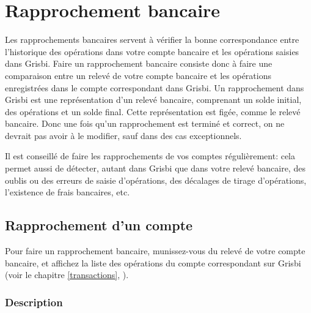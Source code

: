 %


\chapter{Rapprochement bancaire\label{reconciliation}}

Les rapprochements bancaires servent à vérifier la bonne correspondance entre l'historique des opérations dans votre compte bancaire et les opérations saisies dans Grisbi. Faire un rapprochement bancaire consiste donc à faire une comparaison entre un relevé de votre compte bancaire et les opérations enregistrées dans le compte correspondant dans Grisbi. Un rapprochement dans Grisbi est une représentation d'un relevé bancaire, comprenant un solde initial, des opérations et un solde final. Cette représentation est figée, comme le relevé bancaire. Donc une fois qu'un rapprochement est terminé et correct, on ne devrait pas avoir à le modifier, sauf dans des cas exceptionnels.

Il est conseillé de faire les rapprochements de vos comptes régulièrement: cela permet aussi de détecter, autant dans Grisbi que dans votre relevé bancaire, des oublis ou des erreurs de saisie d'opérations, des décalages de tirage d'opérations, l'existence de frais bancaires, etc.


\section{Rapprochement d'un compte\label{reconciliation-account}}

Pour faire un rapprochement bancaire, munissez-vous du relevé de votre compte bancaire, et affichez la liste des opérations du compte correspondant sur Grisbi (voir le chapitre \vref{transactions}, ).


\subsection{Description\label{reconciliation-account-description}}

